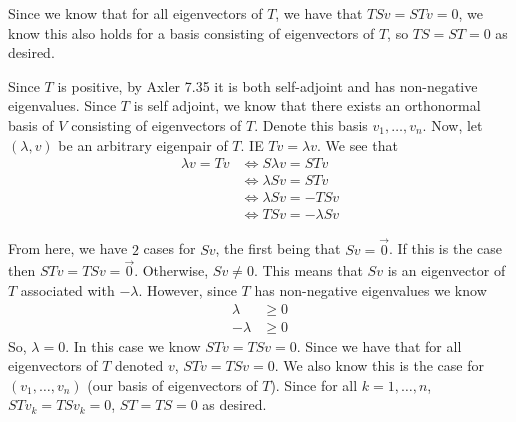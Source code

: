 \documentclass[answers]{exam}
\begin{document}
\begin{questions}
\begin{solution}
        Since we know that for all eigenvectors of $T$, we have that $TSv = STv = 0$, we know this also holds 
        for a basis consisting of eigenvectors of $T$, so $TS=ST=0$ as desired.


         Since $T$ is positive, by Axler 7.35 it is both self-adjoint and has non-negative
        eigenvalues. Since $T$ is self adjoint, we know that there exists an orthonormal basis of $V$ consisting
        of eigenvectors of $T$. Denote this basis $v_1,\dots,v_n$. Now, let $(\lambda,v)$ be an arbitrary 
        eigenpair of $T$. IE $Tv = \lambda v$. We see that
        \begin{align*}
            \lambda v = Tv &\iff S\lambda v = STv \\
            &\iff \lambda Sv = STv \\
            &\iff \lambda Sv = -TSv \\
            &\iff TSv = -\lambda Sv
        \end{align*}

        From here, we have $2$ cases for $Sv$, the first being that $Sv = \vec{0}$. If this is the case then
        $STv = TSv = \vec{0}$. Otherwise, $Sv\neq 0$. This means that $Sv$ is an eigenvector of $T$ associated
        with $-\lambda$. However, since $T$ has non-negative eigenvalues we know
        \begin{align*}
            \lambda &\geq 0 \\
            -\lambda&\geq 0
        \end{align*}
        So, $\lambda = 0$. In this case we know $STv = TSv = 0$. Since we have that for all eigenvectors of $T$
        denoted $v$,
        $STv = TSv = 0$. We also know this is the case for $(v_1,\dots,v_n)$ (our basis of eigenvectors of $T$). 
        Since for all $k=1,\dots,n$, $STv_k = TSv_k = 0$, $ST=TS=0$ as desired.
    \end{solution}
    \question \,

\end{questions}
\end{document}
